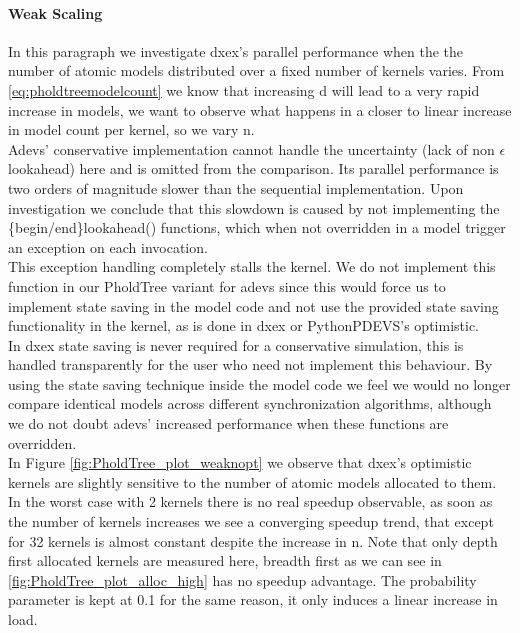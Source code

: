 \paragraph*{Weak Scaling}
In this paragraph we investigate dxex's parallel performance when the the number of atomic models distributed over a fixed number of kernels varies. From \ref{eq:pholdtreemodelcount} we know that increasing d will lead to a very rapid increase in models, we want to observe what happens in a closer to linear increase in model count per kernel, so we vary n. \\


Adevs' conservative implementation cannot handle the uncertainty (lack of non $\epsilon$ lookahead) here and is omitted from the comparison. Its parallel performance is two orders of magnitude slower than the sequential implementation. Upon investigation we conclude that this slowdown is caused by not implementing the \{begin/end\}lookahead() functions, which when not overridden in a model trigger an exception on each invocation. \\
This exception handling completely stalls the kernel. We do not implement this function in our PholdTree variant for adevs since this would force us to implement state saving in the model code and not use the provided state saving functionality in the kernel, as is done in dxex or PythonPDEVS's optimistic.\\
In dxex state saving is never required for a conservative simulation, this is handled transparently for the user who need not implement this behaviour. 
By using the state saving technique inside the model code we feel we would no longer compare identical models across different synchronization algorithms, although we do not doubt adevs' increased performance when these functions are overridden.
\\

In Figure \ref{fig:PholdTree_plot_weaknopt} we observe that dxex's optimistic kernels are slightly sensitive to the number of atomic models allocated to them. In the worst case with 2 kernels there is no real speedup observable, as soon as the number of kernels increases we see a converging speedup trend, that except for 32 kernels is almost constant despite the increase in n. Note that only depth first allocated kernels are measured here, breadth first as we can see in \ref{fig:PholdTree_plot_alloc_high} has no speedup advantage. The probability parameter is kept at 0.1 for the same reason, it only induces a linear increase in load.
\\

